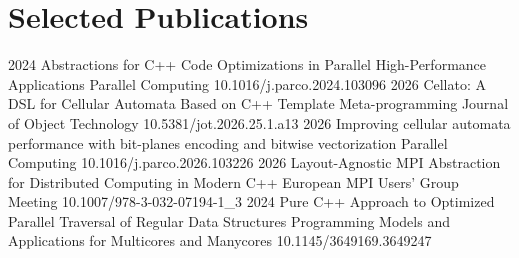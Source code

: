 \ifdefined \industry
\def\abstractionsAbstract{Efficient solutions for facilitating code optimizations in parallel high-performance applications.}
\def\cellatoAbstract{Domain-specific language for speeding up cellular automata simulations (e.g., in biology and materials science).}
\def\bitplanesAbstract{Fast and memory-efficient bit-planes encoding for cellular automata simulations, significantly improving performance.}
\def\mpiAbstract{Solutions for decoupling data layouts from communication, simplifying development and optimization of distributed applications.}
\def\purecppAbstract{Proposes pure C++ abstractions for data structures and algorithms that simplify the development of high-performance applications.}
\def\astuteAbstract{}
\else
\def\abstractionsAbstract{}
\def\cellatoAbstract{}
\def\bitplanesAbstract{}
\def\mpiAbstract{}
\def\purecppAbstract{}
\def\astuteAbstract{}
\fi
\section{Selected Publications}
\begin{enumerate}[leftmargin=1.35em,itemsep=0.15em,topsep=0.2em,label={\textbf{[\arabic*]}}]
  \resumePublication
    {2024}
    {Abstractions for C++ Code Optimizations in Parallel High-Performance Applications}
    {Parallel Computing}
    {10.1016/j.parco.2024.103096}
    {\abstractionsAbstract{}}
  \resumePublication
    {2026}
    {Cellato: A DSL for Cellular Automata Based on C++ Template Meta-programming}
    {Journal of Object Technology}
    {10.5381/jot.2026.25.1.a13}
    {\cellatoAbstract{}}
  \resumePublication
    {2026}
    {Improving cellular automata performance with bit-planes encoding and bitwise vectorization}
    {Parallel Computing}
    {10.1016/j.parco.2026.103226}
    {\bitplanesAbstract{}}
  \resumePublication
    {2026}
    {Layout-Agnostic MPI Abstraction for Distributed Computing in Modern C++}
    {European MPI Users' Group Meeting}
    {10.1007/978-3-032-07194-1\_3}
    {\mpiAbstract{}}
  \resumePublication
    {2024}
    {Pure C++ Approach to Optimized Parallel Traversal of Regular Data Structures}
    {Programming Models and Applications for Multicores and Manycores}
    {10.1145/3649169.3649247}
    {\purecppAbstract{}}
\end{enumerate}
